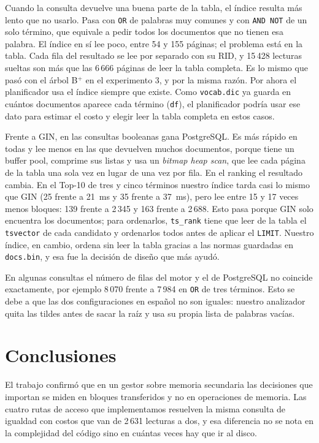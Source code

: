 \documentclass[a4paper,12pt]{article}
\begin{document}
Cuando la consulta devuelve una buena parte de la tabla, el índice resulta más
lento que no usarlo. Pasa con \texttt{OR} de palabras muy comunes y con
\texttt{AND NOT} de un solo término, que equivale a pedir todos los documentos
que no tienen esa palabra. El índice en sí lee poco, entre 54 y 155 páginas; el
problema está en la tabla. Cada fila del resultado se lee por separado con su
RID, y 15\,428 lecturas sueltas son más que las 6\,666 páginas de leer la tabla
completa. Es lo mismo que pasó con el árbol B$^+$ en el experimento 3, y por la
misma razón. Por ahora el planificador usa el índice siempre que existe. Como
\texttt{vocab.dic} ya guarda en cuántos documentos aparece cada término
(\texttt{df}), el planificador podría usar ese dato para estimar el costo y
elegir leer la tabla completa en estos casos.

Frente a GIN, en las consultas booleanas gana PostgreSQL. Es más rápido en todas
y lee menos en las que devuelven muchos documentos, porque tiene un buffer pool,
comprime sus listas y usa un \textit{bitmap heap scan}, que lee cada página de la
tabla una sola vez en lugar de una vez por fila. En el ranking el resultado
cambia. En el Top-10 de tres y cinco términos nuestro índice tarda casi lo mismo
que GIN (25 frente a 21~ms y 35 frente a 37~ms), pero lee entre 15 y 17 veces
menos bloques: 139 frente a 2\,345 y 163 frente a 2\,688. Esto pasa porque GIN
solo encuentra los documentos; para ordenarlos, \texttt{ts\_rank} tiene que leer
de la tabla el \texttt{tsvector} de cada candidato y ordenarlos todos antes de
aplicar el \texttt{LIMIT}. Nuestro índice, en cambio, ordena sin leer la tabla
gracias a las normas guardadas en \texttt{docs.bin}, y esa fue la decisión de
diseño que más ayudó.

En algunas consultas el número de filas del motor y el de PostgreSQL no coincide
exactamente, por ejemplo 8\,070 frente a 7\,984 en \texttt{OR} de tres términos.
Esto se debe a que las dos configuraciones en español no son iguales: nuestro
analizador quita las tildes antes de sacar la raíz y usa su propia lista de
palabras vacías.

\section{Conclusiones}

El trabajo confirmó que en un gestor sobre memoria secundaria las decisiones que
importan se miden en bloques transferidos y no en operaciones de memoria. Las
cuatro rutas de acceso que implementamos resuelven la misma consulta de igualdad
con costos que van de 2\,631 lecturas a dos, y esa diferencia no se nota en la
complejidad del código sino en cuántas veces hay que ir al disco.
\end{document}

